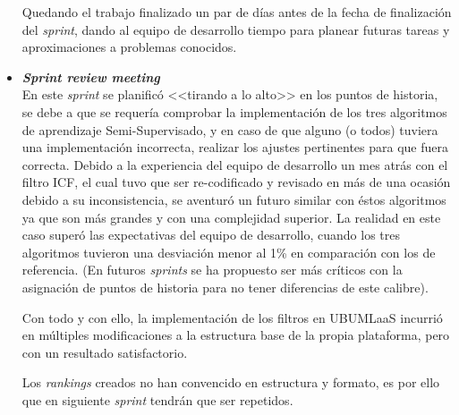 \begin{itemize}
Quedando el trabajo finalizado un par de días antes de la fecha de finalización del \textit{sprint}, dando al equipo de desarrollo tiempo para planear futuras tareas y aproximaciones a problemas conocidos.

\item \textbf{\textit{Sprint review meeting}}\\
En este \textit{sprint} se planificó <<tirando a lo alto>> en los puntos de historia, se debe a que se requería comprobar la implementación de los tres algoritmos de aprendizaje Semi-Supervisado, y en caso de que alguno (o todos) tuviera una implementación incorrecta, realizar los ajustes pertinentes para que fuera correcta. Debido a la experiencia del equipo de desarrollo un mes atrás con el filtro ICF, el cual tuvo que ser re-codificado y revisado en más de una ocasión debido a su inconsistencia, se aventuró un futuro similar con éstos algoritmos ya que son más grandes y con una complejidad superior. La realidad en este caso superó las expectativas del equipo de desarrollo, cuando los tres algoritmos tuvieron una desviación menor al 1\% en comparación con los de referencia. (En futuros \textit{sprints} se ha propuesto ser más críticos con la asignación de puntos de historia para no tener diferencias de este calibre).

Con todo y con ello, la implementación de los filtros en UBUMLaaS incurrió en múltiples modificaciones a la estructura base de la propia plataforma, pero con un resultado satisfactorio.

Los \textit{rankings} creados no han convencido en estructura y formato, es por ello que en siguiente \textit{sprint} tendrán que ser repetidos.
\end{itemize}

